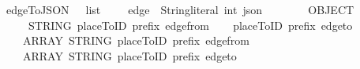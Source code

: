 \isamarkupfalse%
\ edgeToJSON\ {\isacharcolon}{\isacharcolon}\ {\isachardoublequoteopen}\ list\ {\isasymRightarrow}\ {\isacharparenleft}\ \ \ edge\ {\isasymRightarrow}\ {\isacharparenleft}String{\isachardot}literal{\isacharcomma}\ int{\isacharparenright}\ json{\isachardoublequoteclose}\isanewline
\ \ \ {\isachardoublequoteopen}\ \ {\isacharequal}\isanewline
\ \ OBJECT\ {\isacharbrackleft}\isanewline
\ \ \ \ {\isacharparenleft}\ STRING\ {\isacharparenleft}placeToID\ prefix\ {\isacharparenleft}edge{\isacharunderscore}from\ \ {\isacharplus}\isanewline
{}\isaString{{\isacharminus}}\ {\isacharplus}\isanewline
{}placeToID\ prefix\ {\isacharparenleft}edge{\isacharunderscore}to\ \isanewline
\ \ {\isacharcomma}\ {\isacharparenleft}\ ARRAY\ {\isacharbrackleft}STRING\ {\isacharparenleft}placeToID\ prefix\ {\isacharparenleft}edge{\isacharunderscore}from\ \isanewline
\ \ {\isacharcomma}\ {\isacharparenleft}\ ARRAY\ {\isacharbrackleft}STRING\ {\isacharparenleft}placeToID\ prefix\ {\isacharparenleft}edge{\isacharunderscore}to\ 
